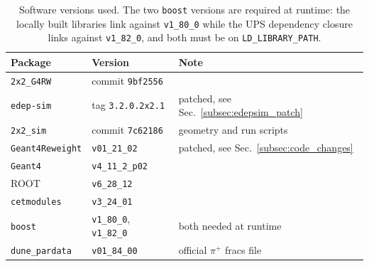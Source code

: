 \documentclass[%
article,
nofootinbib
]{revtex4-2}
\DeclareRobustCommand{\gfour}{\texttt{Geant4}}
\begin{document}

\begin{table}[H]
\centering
\caption{Software versions used. The two \texttt{boost} versions are
required at runtime: the locally built libraries link against
\texttt{v1\_80\_0} while the UPS dependency closure links against
\texttt{v1\_82\_0}, and both must be on \texttt{LD\_LIBRARY\_PATH}.}
\label{tab:loc_versions}
\setlength{\tabcolsep}{18pt}
\begin{tabular}{lll}
\hline\hline
Package & Version & Note \\
\hline
\texttt{2x2\_G4RW}      & commit \texttt{9bf2556} & \\
\texttt{edep-sim}       & tag \texttt{3.2.0.2x2.1} & patched, see Sec.~\ref{subsec:edepsim_patch} \\
\texttt{2x2\_sim}       & commit \texttt{7c62186} & geometry and run scripts \\
\texttt{Geant4Reweight} & \texttt{v01\_21\_02} & patched, see Sec.~\ref{subsec:code_changes} \\
\gfour{}                & \texttt{v4\_11\_2\_p02} & \\
ROOT                    & \texttt{v6\_28\_12} & \\
\texttt{cetmodules}     & \texttt{v3\_24\_01} & \\
\texttt{boost}          & \texttt{v1\_80\_0}, \texttt{v1\_82\_0} & both needed at runtime \\
\texttt{dune\_pardata}  & \texttt{v01\_84\_00} & official $\pi^{+}$ fracs file \\
\hline\hline
\end{tabular}
\end{table}
\end{document}
